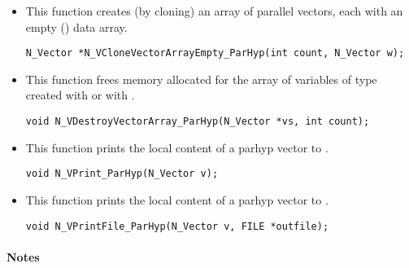 \begin{itemize}
\item {}
 
  This function creates (by cloning) an array of  parallel vectors,
  each with an empty () data array.
 
\begin{verbatim}
N_Vector *N_VCloneVectorArrayEmpty_ParHyp(int count, N_Vector w);
\end{verbatim}


\item {}
 
 This function frees memory allocated for the array of   variables of
 type  created with  or with
 .
 

 \verb|void N_VDestroyVectorArray_ParHyp(N_Vector *vs, int count);|



\item {}
  
  This function prints the local content of a parhyp vector to .
    
  \verb|void N_VPrint_ParHyp(N_Vector v);|


\item {}
  
  This function prints the local content of a parhyp vector to .
    
  \verb|void N_VPrintFile_ParHyp(N_Vector v, FILE *outfile);|

\end{itemize}

\paragraph{\bf Notes} 
           
